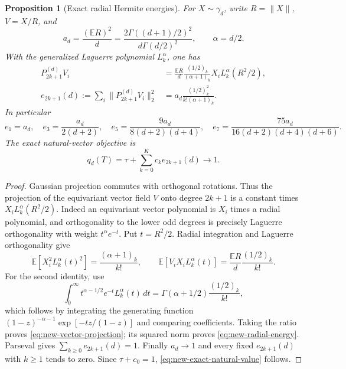 \documentclass[11pt]{article}
\newtheorem{proposition}[theorem]{Proposition}
\begin{document}
\begin{proposition}[Exact radial Hermite energies]
\label{prop:new-all-radial-energies}
For $X\sim\gamma_d$, write $R=\|X\|$, $V=X/R$, and
\[
 a_d=\frac{(\mathbb ER)^2}{d}
 =\frac{2\Gamma((d+1)/2)^2}{d\Gamma(d/2)^2},\qquad \alpha=d/2.
\]
With the generalized Laguerre polynomial $L_k^\alpha$, one has
\begin{align}
 P_{2k+1}^{(d)}V_i
  &=\frac{\mathbb ER}{d}\frac{(1/2)_k}{(\alpha+1)_k}
             X_iL_k^\alpha(R^2/2),\label{eq:new-vector-projection}\\
 e_{2k+1}(d):=\sum_i\|P_{2k+1}^{(d)}V_i\|_2^2
  &=a_d\frac{(1/2)_k^2}{k!(\alpha+1)_k}.
             \label{eq:new-radial-energy}
\end{align}
In particular
\[
 e_1=a_d,\quad e_3=\frac{a_d}{2(d+2)},\quad
 e_5=\frac{9a_d}{8(d+2)(d+4)},\quad
 e_7=\frac{75a_d}{16(d+2)(d+4)(d+6)}.
\]
The exact natural-vector objective is
\begin{equation}\label{eq:new-exact-natural-value}
 q_d(T)=\tau+\sum_{k=0}^Kc_ke_{2k+1}(d)\longrightarrow1.
\end{equation}
\end{proposition}
\begin{proof}
Gaussian projection commutes with orthogonal rotations.  Thus the
projection of the equivariant vector field $V$ onto degree $2k+1$ is
a constant times $X_iL_k^\alpha(R^2/2)$.  Indeed an equivariant vector
polynomial is $X_i$ times a radial polynomial, and orthogonality to
the lower odd degrees is precisely Laguerre orthogonality with
weight $t^\alpha e^{-t}$.
Put $t=R^2/2$.  Radial integration and Laguerre orthogonality give
\[
 \mathbb E[X_i^2L_k^\alpha(t)^2]=\frac{(\alpha+1)_k}{k!},\qquad
 \mathbb E[V_iX_iL_k^\alpha(t)]
       =\frac{\mathbb ER}{d}\frac{(1/2)_k}{k!}.
\]
For the second identity, use
\[
 \int_0^\infty t^{\alpha-1/2}e^{-t}L_k^\alpha(t)\,dt
       =\Gamma(\alpha+1/2)\frac{(1/2)_k}{k!},
\]
which follows by integrating the generating function
$(1-z)^{-\alpha-1}\exp[-tz/(1-z)]$ and comparing coefficients.
Taking the ratio proves \eqref{eq:new-vector-projection}; its squared
norm proves \eqref{eq:new-radial-energy}.  Parseval gives
$\sum_{k\geq0}e_{2k+1}(d)=1$.  Finally $a_d\to1$ and every fixed
$e_{2k+1}(d)$ with $k\geq1$ tends to zero.  Since $\tau+c_0=1$,
\eqref{eq:new-exact-natural-value} follows.
\end{proof}
\end{document}
